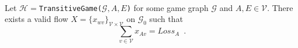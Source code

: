 \begin{lemma} \ \\
   \label{gameflow}
   Let $\mathcal{H} = $\texttt{TransitiveGame(}$\mathcal{G}, A, E$\texttt{)} for some game graph $\mathcal{G}$ and $A,
   E \in \mathcal{V}$. There exists a valid flow
   $X = \{x_{wv}\}_{\mathcal{V} \times \mathcal{V}}$ on $\mathcal{G}_0$ such that
   \begin{equation*}
      \sum\limits_{v \in \mathcal{V}}x_{Av} = Loss_A \enspace.
   \end{equation*}
\end{lemma}
